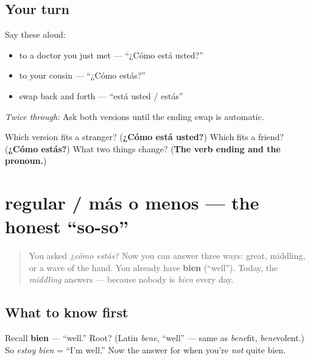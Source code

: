 \subsection*{Your turn}
Say these aloud:

\begin{itemize}
\raggedright
  \item to a doctor you just met — \textquotedblleft{}¿Cómo está usted?\textquotedblright{}
  \item to your cousin — \textquotedblleft{}¿Cómo estás?\textquotedblright{}
  \item swap back and forth — \textquotedblleft{}está usted / estás\textquotedblright{}
\end{itemize}

\emph{Twice through:} Ask both versions until the ending swap is automatic.

\begin{tcolorbox}[breakable,colback=teal!4,colframe=teal!35!black,title={Before you move on}]
Which version fits a stranger? (\textbf{¿Cómo está usted?}) Which fits a friend? (\textbf{¿Cómo estás?}) What two things change? (\textbf{The verb ending and the pronoun.})
\end{tcolorbox}
\section[regular]{regular / más o menos — the honest \textquotedblleft{}so-so\textquotedblright{}}

\label{lesson:ES-C04-regular}



\begin{quote}
You asked \emph{¿cómo estás?} Now you can answer three ways: great, middling, or a wave of the hand. You already have \textbf{bien} (\textquotedblleft{}well\textquotedblright{}). Today, the \emph{middling} answers — because nobody is \emph{bien} every day.
\end{quote}

\subsection*{What to know first}
Recall \textbf{bien} — \textquotedblleft{}well.\textquotedblright{} Root? (Latin \emph{bene}, \textquotedblleft{}well\textquotedblright{} — same as \emph{bene}fit, \emph{bene}volent.) So \emph{estoy bien} = \textquotedblleft{}I'm well.\textquotedblright{} Now the answer for when you're \emph{not} quite bien.

